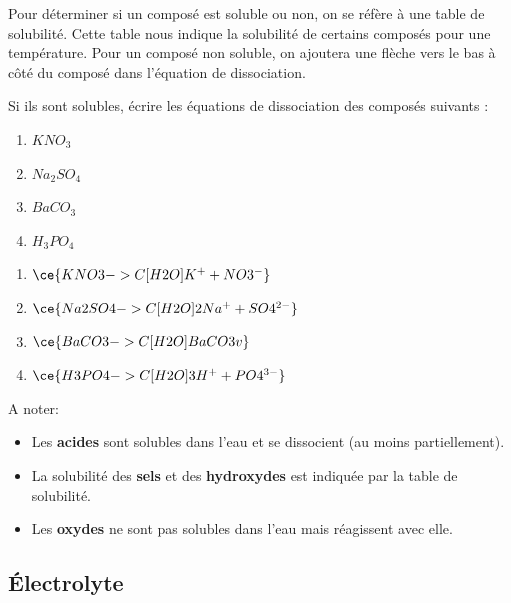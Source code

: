 \documentclass[
  11pt,
  a4paper,
  openany]{book}
\providecommand{\tightlist}{%
  \setlength{\itemsep}{0pt}\setlength{\parskip}{0pt}}
\begin{document}
Pour déterminer si un composé est soluble ou non, on se réfère à une table de solubilité. Cette table nous indique la solubilité de certains composés pour une température. Pour un composé non soluble, on ajoutera une flèche vers le bas à côté du composé dans l'équation de dissociation.

\begin{Exercise}

Si ils sont solubles, écrire les équations de dissociation des composés suivants :

\begin{enumerate}
\def\labelenumi{\arabic{enumi}.}
\item
  \(KNO_3\)
\item
  \(Na_2SO_4\)
\item
  \(BaCO_3\)
\item
  \(H_3PO_4\)
\end{enumerate}

\end{Exercise}

\begin{Answer}

\begin{enumerate}
\def\labelenumi{\arabic{enumi}.}
\item
  \(\ce{KNO3 ->C[H2O] K^{+} + NO3^{-} }\)
\item
  \(\ce{Na2SO4 ->C[H2O] 2 Na^{+} + SO4^{2-} }\)
\item
  \(\ce{BaCO3 ->C[H2O] BaCO3 v }\)
\item
  \(\ce{H3PO4 ->C[H2O] 3 H^{+} + PO4^{3-} }\)
\end{enumerate}

\end{Answer}

A noter:

\begin{itemize}
\tightlist
\item
  Les \textbf{acides} sont solubles dans l'eau et se dissocient (au moins partiellement).
\item
  La solubilité des \textbf{sels} et des \textbf{hydroxydes} est indiquée par la table de solubilité.
\item
  Les \textbf{oxydes} ne sont pas solubles dans l'eau mais réagissent avec elle.
\end{itemize}

\newpage

\subsection{Électrolyte}\label{uxe9lectrolyte}
\end{document}
